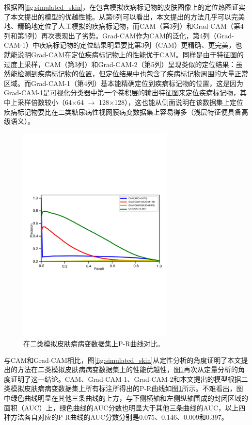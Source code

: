 根据图\ref{fig:simulated_skin}，在包含模拟疾病标记物的皮肤图像上的定位热图证实了本文提出的模型的优越性能。从第6列可以看出，本文提出的方法几乎可以完美地、精确地定位了人工模拟的疾病标记物，而CAM（第3列）和Grad-CAM（第4列和第5列）再次表现出了劣势。Grad-CAM作为CAM的泛化，第4列（Grad-CAM-1）中疾病标记物的定位结果明显要比第3列（CAM）更精确、更完美，也就能说明Grad-CAM在定位疾病标记物上的性能优于CAM。同样是由于特征图的过度上采样，CAM（第3列）和Grad-CAM-2（第5列）呈现类似的定位结果：虽然能检测到疾病标记物的位置，但定位结果中也包含了疾病标记物周围的大量正常区域。而Grad-CAM-1（第4列）基本能精确定位到疾病标记物的位置，这是因为Grad-CAM-1是可视化分类器中第一个卷积层的输出特征图来定位疾病标记物，其中上采样倍数较小（64$\times$64 $\rightarrow$ 128$\times$128），这也能从侧面说明在该数据集上定位疾病标记物要比在二类糖尿病性视网膜病变数据集上容易得多（浅层特征便具备高级语义）。
\begin{figure}[h]
	\centering
	\includegraphics[width=0.7\textwidth]{figure/pr_curve_skin_image/pr_curve.pdf}
	\caption[在二类模拟皮肤病病变数据集上P-R曲线对比]{在二类模拟皮肤病病变数据集上P-R曲线对比。}
	\label{fig:simulated_skin_pr_curve}
\end{figure}

与CAM和Grad-CAM相比，图\ref{fig:simulated_skin}从定性分析的角度证明了本文提出的方法在二类模拟皮肤病病变数据集上的性能优越性，图\ref{fig:simulated_skin_pr_curve}再次从定量分析的角度证明了这一结论。CAM、Grad-CAM-1、Grad-CAM-2和本文提出的模型根据二类模拟皮肤病病变数据集上所有标注所得出的P-R曲线如图\ref{fig:simulated_skin_pr_curve}所示。不难看出，图中绿色曲线明显在其他三条曲线的上方，与下侧横轴和左侧纵轴围成的封闭区域的面积（AUC）上，绿色曲线的AUC分数也明显大于其他三条曲线的AUC，以上四种方法各自对应的P-R曲线的AUC分数分别是0.075、0.146、0.009和0.397。


